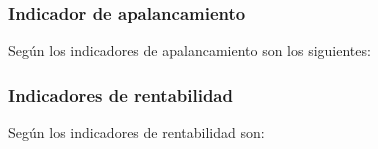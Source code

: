 \subsubsection{Indicador de apalancamiento}
Seg\'un \cite{cruz} los indicadores de apalancamiento son los siguientes:




\subsubsection{Indicadores de rentabilidad}
Seg\'un \cite{cruz} los indicadores de rentabilidad son:





